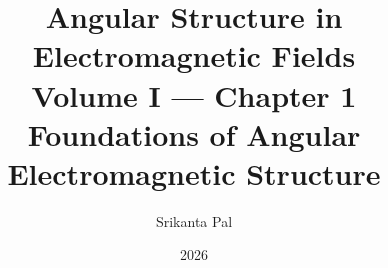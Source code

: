 

\title{Angular Structure in Electromagnetic Fields\\[0.4em]
  \large Volume I --- Chapter 1\\[0.3em]
  \normalsize Foundations of Angular Electromagnetic Structure}
\author{Srikanta Pal}
\date{2026}


\makeatletter
\begingroup
\setcounter{chapter}{1}
\label{ch:02}
\label{ch:03}
\label{ch:04}
\setcounter{chapter}{0}
\endgroup
\makeatother
\maketitle
\tableofcontents
\clearpage





\let\cleardoublepage\clearpage




